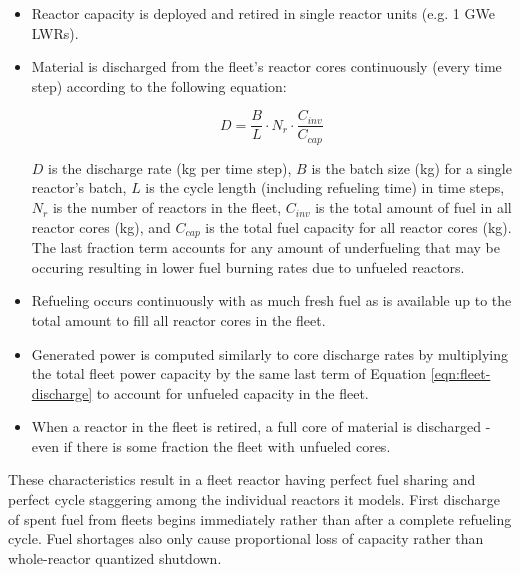 \documentclass{style}
\begin{document}
\begin{itemize}

    \item Reactor capacity is deployed and retired in single reactor units
        (e.g. 1 GWe LWRs).

    \item Material is discharged from the fleet's reactor cores continuously
        (every time step) according to the following equation:

        \begin{equation}
            D =
            \frac{B}{L} \cdot N_{r} \cdot \frac{C_{inv}}{C_{cap}}
            \label{eqn:fleet-discharge}
        \end{equation}

        $D$ is the discharge rate (kg per time step), $B$ is the batch size
        (kg) for a single reactor's batch, $L$ is the cycle length (including
        refueling time) in time steps, $N_{r}$ is the number of
        reactors in the fleet, $C_{inv}$ is the total amount of fuel in all
        reactor cores (kg), and $C_{cap}$ is the total fuel capacity for all
        reactor cores (kg).  The last fraction term accounts for any amount of
        underfueling that may be occuring resulting in lower fuel burning
        rates due to unfueled reactors.

    \item Refueling occurs continuously with as much fresh fuel as is
        available up to the total amount to fill all reactor cores in the
        fleet.

    \item Generated power is computed similarly to core discharge rates by
        multiplying the total fleet power capacity by the same last term of
        Equation \ref{eqn:fleet-discharge} to account for unfueled capacity in
        the fleet.

    \item When a reactor in the fleet is retired, a full core of material is
        discharged - even if there is some fraction the fleet with unfueled
        cores.
        
\end{itemize}

These characteristics result in a fleet reactor having perfect fuel sharing
and perfect cycle staggering among the individual reactors it models.  First
discharge of spent fuel from fleets begins immediately rather than after a
complete refueling cycle. Fuel shortages also only cause proportional loss of
capacity rather than whole-reactor quantized shutdown.
\end{document}
